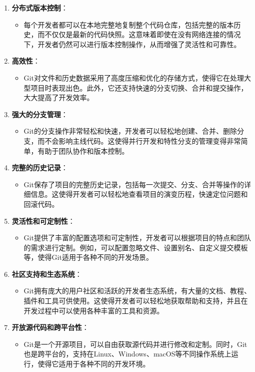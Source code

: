 \documentclass[12pt]{article}
\begin{document}
	
	\begin{enumerate}
		\item \textbf{分布式版本控制}：
		\begin{itemize}
			\item 每个开发者都可以在本地完整地复制整个代码仓库，包括完整的版本历史，而不仅仅是最新的代码快照。这意味着即使在没有网络连接的情况下，开发者仍然可以进行版本控制操作，从而增强了灵活性和可靠性。
		\end{itemize}
		\item \textbf{高效性}：
		\begin{itemize}
			\item Git对文件和历史数据采用了高度压缩和优化的存储方式，使得它在处理大型项目时表现出色。此外，它还支持快速的分支切换、合并和提交操作，大大提高了开发效率。
		\end{itemize}
		\item \textbf{强大的分支管理}：
		\begin{itemize}
			\item Git的分支操作非常轻松和快速，开发者可以轻松地创建、合并、删除分支，而不会影响主线代码。这使得并行开发和特性分支的管理变得非常简单，有助于团队协作和版本控制。
		\end{itemize}
		\item \textbf{完整的历史记录}：
		\begin{itemize}
			\item Git保存了项目的完整历史记录，包括每一次提交、分支、合并等操作的详细信息。这使得开发者可以轻松地查看项目的演变历程，快速定位问题和回滚代码。
		\end{itemize}
		\item \textbf{灵活性和可定制性}：
		\begin{itemize}
			\item Git提供了丰富的配置选项和可定制性，开发者可以根据项目的特点和团队的需求进行定制。例如，可以配置忽略文件、设置别名、自定义提交模板等，使得Git适用于各种不同的开发场景。
		\end{itemize}
		\item \textbf{社区支持和生态系统}：
		\begin{itemize}
			\item Git拥有庞大的用户社区和活跃的开发者生态系统，有大量的文档、教程、插件和工具可供使用。这使得开发者可以轻松地获取帮助和支持，并且在开发过程中可以使用各种丰富的工具和资源。
		\end{itemize}
		\item \textbf{开放源代码和跨平台性}：
		\begin{itemize}
			\item Git是一个开源项目，可以自由获取源代码并进行修改和定制。同时，Git也是跨平台的，支持在Linux、Windows、macOS等不同操作系统上运行，使得它适用于各种不同的开发环境。
		\end{itemize}
	\end{enumerate}
	
\end{document}

